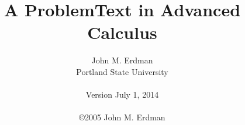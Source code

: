 \documentclass[11pt,reqno]{amsbook}
\theoremstyle{plain}
\theoremstyle{definition}
\theoremstyle{remark}
\numberwithin{equation}{chapter}
\begin{document}
 \frontmatter
 \title{A ProblemText in Advanced Calculus}
 \author{John M. Erdman \\
      Portland State University \\
      \mbox{\hphantom{P}} \\
      Version July 1, 2014  \\
      \mbox{\hphantom{P}} \\
      \copyright 2005 John M. Erdman \\
      \mbox{\hphantom{P}} \\
            \mbox{\hphantom{P}} \\
                  \mbox{\hphantom{P}} }






\maketitle

\tableofcontents



 \cleardoublepage



%

\mainmatter































\end{document}
